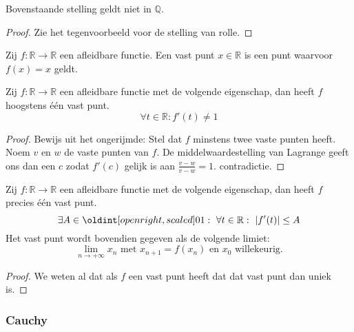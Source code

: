 \documentclass[main.tex]{subfiles}
\begin{document}
\begin{tvb}
  Bovenstaande stelling geldt niet in $\mathbb{Q}$.
  \begin{proof}
    Zie het tegenvoorbeeld voor de stelling van rolle.
  \end{proof}
\end{tvb}


\begin{de}
  Zij $f:\mathbb{R} \rightarrow \mathbb{R}$ een afleidbare functie.
  Een vast punt $x \in \mathbb{R}$ is een punt waarvoor $f(x) = x$ geldt.
\end{de}

\begin{st}
  \label{st:vast-punt-uniek-voor-specifieke-functie}
  Zij $f:\mathbb{R} \rightarrow \mathbb{R}$ een afleidbare functie met de volgende eigenschap, dan heeft $f$ hoogstens \'e\'en vast punt.
  \[ \forall t\in \mathbb{R}: f'(t) \neq 1 \]
  
  \begin{proof}
    Bewijs uit het ongerijmde: Stel dat $f$ minstens twee vaste punten heeft.\\
    Noem $v$ en $w$ de vaste punten van $f$.
    De middelwaardestelling van Lagrange geeft ons dan een $c$ zodat $f'(c)$ gelijk is aan $\frac{v-w}{v-w} = 1$. contradictie.
  \end{proof}
\end{st}

\begin{st}
  Zij $f:\mathbb{R} \rightarrow \mathbb{R}$ een afleidbare functie met de volgende eigenschap, dan heeft $f$ precies \'e\'en vast punt.
  \[ \exists A \in \interval[open right]{0}{1}:\ \forall t \in \mathbb{R}:\ |f'(t)| \le A \]
  Het vast punt wordt bovendien gegeven als de volgende limiet:
  \[ \lim_{n \rightarrow +\infty}x_{n} \text{ met } x_{n+1} = f(x_{n}) \text{ en } x_{0} \text{ willekeurig.} \]

  \begin{proof}
    We weten al dat als $f$ een vast punt heeft dat dat vast punt dan uniek is.
  \end{proof}
\end{st}


\subsubsection{Cauchy}
\label{sec:cauchy}
\end{document}
